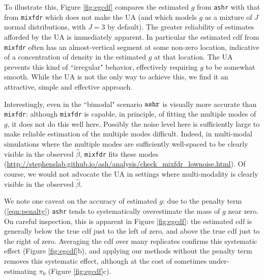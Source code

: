 \documentclass[11pt]{article}
\def\bhat{\hat{\beta}}
\def\mixfdr{{\tt mixfdr}\xspace}
\def\ashr{{\tt ashr}\xspace}
\begin{document}
To illustrate this, Figure \ref{fig:egcdf} compares the
estimated $g$ from \ashr  with that from \mixfdr which does not make the UA 
(and which models $g$ as a mixture of $J$ normal distributions, with $J=3$ by default).
The greater reliability of estimates afforded
by the UA is immediately apparent. In particular the estimated cdf from \mixfdr often has an almost-vertical
segment at some non-zero location, indicative of a concentration of density in the estimated $g$ at that location. 
The UA prevents this kind of ``irregular" behavior, effectively requiring $g$ to be somewhat smooth.
While the UA is not the only way to achieve this, we find it an attractive, simple and effective approach.

Interestingly, even in the ``bimodal" scenario $\ashr$ 
is visually more accurate than \mixfdr: although \mixfdr is capable, in principle, of fitting the multiple modes of $g$, it does not do this well here. 
Possibly the noise level here is sufficiently large to make reliable estimation of the multiple modes difficult. 
Indeed, in multi-modal simulations where the multiple modes are sufficiently well-spaced
to be clearly visible in the observed $\bhat$, \mixfdr fits these modes 
(\url{http://stephenslab.github.io/ash/analysis/check_mixfdr_lownoise.html}). 
Of course, we would not advocate the UA in settings where multi-modality is 
clearly visible in the observed $\bhat$.

We note one caveat on the accuracy of estimated $g$: due to the penalty term (\ref{eqn:penalty}) \ashr tends to systematically
overestimate the mass of $g$ near zero. On careful inspection, this is apparent in Figure \ref{fig:egcdf}: the estimated cdf is generally below the true cdf just to the left of zero,
and above the true cdf just to the right of zero. Averaging the cdf over many replicates confirms this systematic effect (Figure \ref{fig:egcdf}b),
and applying our methods without the penalty term removes this systematic effect, although at the cost of sometimes 
under-estimating $\pi_0$ (Figure \ref{fig:egcdf}c). 
\end{document}
